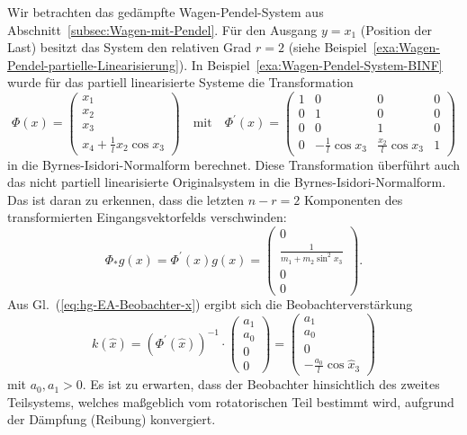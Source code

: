 \begin{example}
\label{exa:Wagen-Pendel-HG-BINF}Wir betrachten das gedämpfte Wagen-Pendel-System
aus Abschnitt~\ref{subsec:Wagen-mit-Pendel}. Für den Ausgang $y=x_{1}$
(Position der Last) besitzt das System den relativen Grad $r=2$ (siehe
Beispiel~\ref{exa:Wagen-Pendel-partielle-Linearisierung}). In Beispiel~\ref{exa:Wagen-Pendel-System-BINF}
wurde für das partiell linearisierte Systeme die Transformation
\[
\Phi(x)=\left(\begin{array}{c}
x_{1}\\
x_{2}\\
x_{3}\\
x_{4}+\frac{1}{l}x_{2}\cos x_{3}
\end{array}\right)\quad\text{mit}\quad\Phi^{\prime}(x)=\left(\begin{array}{cccc}
1 & 0 & 0 & 0\\
0 & 1 & 0 & 0\\
0 & 0 & 1 & 0\\
0 & -\frac{1}{l}\cos x_{3} & \frac{x_{2}}{l}\cos x_{3} & 1
\end{array}\right)
\]
in die Byrnes-Isidori-Normalform berechnet. Diese Transformation überführt
auch das nicht partiell linearisierte Originalsystem in die Byrnes-Isidori-Normalform.
Das ist daran zu erkennen, dass die letzten $n-r=2$ Komponenten des
transformierten Eingangsvektorfelds verschwinden:
\[
\Phi_{*}g(x)=\Phi^{\prime}(x)g(x)=\left(\begin{array}{c}
0\\
\frac{1}{m_{1}+m_{2}\sin^{2}x_{3}}\\
0\\
0
\end{array}\right).
\]
Aus Gl.~(\ref{eq:hg-EA-Beobachter-x}) ergibt sich die Beobachterverstärkung
\[
k(\hat{x})=\left(\Phi^{\prime}(\hat{x})\right)^{-1}\cdot\left(\begin{array}{c}
a_{1}\\
a_{0}\\
\hline 0\\
0
\end{array}\right)=\left(\begin{array}{c}
a_{1}\\
a_{0}\\
0\\
-\frac{a_{0}}{l}\cos\hat{x}_{3}
\end{array}\right)
\]
mit $a_{0},a_{1}>0$. Es ist zu erwarten, dass der Beobachter hinsichtlich
des zweites Teilsystems, welches maßgeblich vom rotatorischen Teil
bestimmt wird, aufgrund der Dämpfung (Reibung) konvergiert. 
\end{example}


